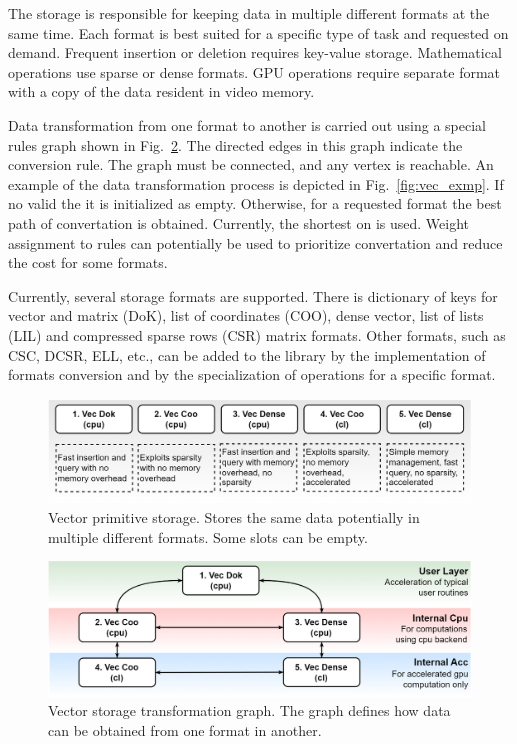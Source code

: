 The storage is responsible for keeping data in multiple different formats at the same time. 
Each format is best suited for a specific type of task and requested on demand. 
Frequent insertion or deletion requires key-value storage. 
Mathematical operations use sparse or dense formats. 
GPU operations require separate format with a copy of the data resident in video memory.

Data transformation from one format to another is carried out using a special rules graph shown in Fig.~\ref{fig:vec_tsf}. 
The directed edges in this graph indicate the conversion rule. 
The graph must be connected, and any vertex is reachable. 
An example of the data transformation process is depicted in Fig.~\ref{fig:vec_exmp}. 
If no valid the it is initialized as empty. 
Otherwise, for a requested format the best path of convertation is obtained. Currently, the shortest on is used. 
Weight assignment to rules can potentially be used to prioritize convertation and reduce the cost for some formats. 

Currently, several storage formats are supported. 
There is dictionary of keys for vector and matrix (DoK), list of coordinates (COO), dense vector, list of lists (LIL) and compressed sparse rows (CSR) matrix formats.  
Other formats, such as CSC, DCSR, ELL, etc., can be added to the library by the implementation of formats conversion and by the specialization of operations for a specific format.

\begin{figure}[b]
\centering
\includegraphics[width=0.95\linewidth]{figures/vector_storage.png}
\caption{Vector primitive storage. Stores the same data potentially in multiple different formats. Some slots can be empty.}
\label{fig:vec_storage}
\end{figure}

\begin{figure}[]
\centering
\includegraphics[width=0.95\linewidth]{figures/storage_transformation_graph.png}
\caption{Vector storage transformation graph. The graph defines how data can be obtained from one format in another.}
\label{fig:vec_tsf}
\end{figure}

